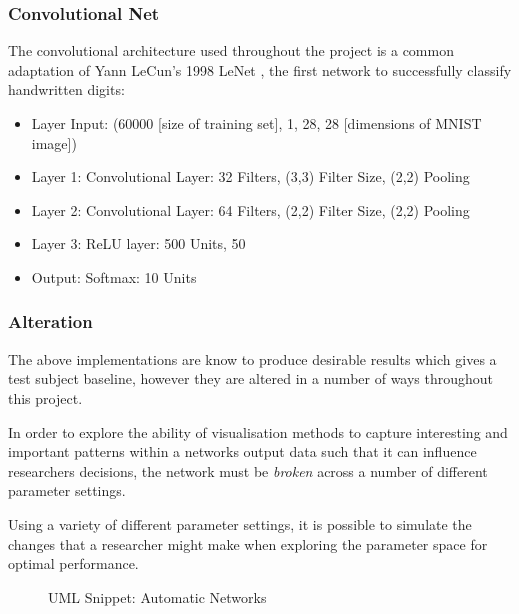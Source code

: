 \documentclass[a4paper,11pt,titlepage]{article}
\begin{document}
		\subsubsection{Convolutional Net}

		The convolutional architecture used throughout the project is a common adaptation of Yann LeCun's 1998 LeNet \cite{LeCun1998}, the first network to successfully classify handwritten digits: 
		\begin{itemize}
			\item Layer Input: (60000 [size of training set], 1, 28, 28 [dimensions of MNIST image])
			\item Layer 1: Convolutional Layer: 32 Filters, (3,3) Filter Size, (2,2) Pooling
			\item Layer 2: Convolutional Layer: 64 Filters, (2,2) Filter Size, (2,2) Pooling
			\item Layer 3: ReLU layer: 500 Units, 50%
			\item Output: Softmax: 10 Units
		\end{itemize}
		\par 
		
		\subsubsection{Alteration}
		The above implementations are know to produce desirable results which gives a test subject baseline, however they are altered in a number of ways throughout this project. 
		\par 
		In order to explore the ability of visualisation methods to capture interesting and important patterns within a networks output data such that it can influence researchers decisions, the network must be \textit{broken} across a number of different parameter settings.
		\par 
Using a variety of different parameter settings, it is possible to simulate the changes that a researcher might make when exploring the parameter space for optimal performance.
		
	\begin{figure}[H]
    			\caption{UML Snippet: Automatic Networks}%
	\end{figure}	
	
\end{document}
